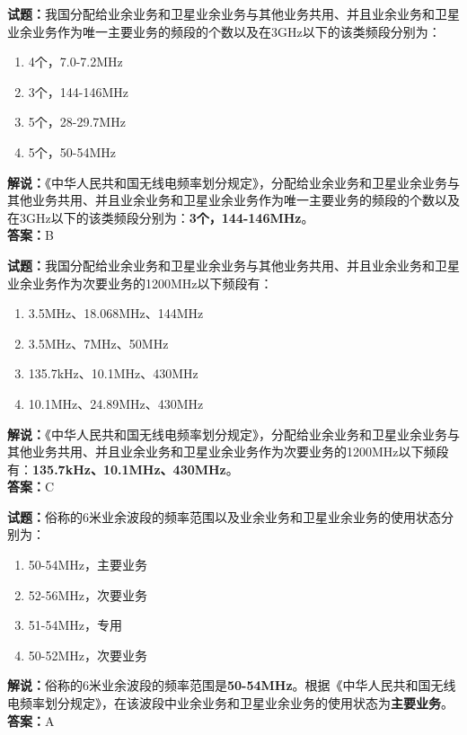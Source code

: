 \documentclass{ctexbook}
\begin{document}
\bigskip


\noindent\textbf{试题：}我国分配给业余业务和卫星业余业务与其他业务共用、并且业余业务和卫星业余业务作为唯一主要业务的频段的个数以及在3GHz以下的该类频段分别为：
\begin{enumerate}[leftmargin=3em]
	\item 4个，7.0-7.2MHz
	\item 3个，144-146MHz
	\item 5个，28-29.7MHz
	\item 5个，50-54MHz
\end{enumerate}
\noindent\textbf{解说：}《中华人民共和国无线电频率划分规定》，分配给业余业务和卫星业余业务与其他业务共用、并且业余业务和卫星业余业务作为唯一主要业务的频段的个数以及在3GHz以下的该类频段分别为：\textbf{3个，144-146MHz}。\\\noindent\textbf{答案：}B


\bigskip


\noindent\textbf{试题：}我国分配给业余业务和卫星业余业务与其他业务共用、并且业余业务和卫星业余业务作为次要业务的1200MHz以下频段有：
\begin{enumerate}[leftmargin=3em]
	\item 3.5MHz、18.068MHz、144MHz
	\item 3.5MHz、7MHz、50MHz
	\item 135.7kHz、10.1MHz、430MHz
	\item 10.1MHz、24.89MHz、430MHz
\end{enumerate}
\noindent\textbf{解说：}《中华人民共和国无线电频率划分规定》，分配给业余业务和卫星业余业务与其他业务共用、并且业余业务和卫星业余业务作为次要业务的1200MHz以下频段有：\textbf{135.7kHz、10.1MHz、430MHz}。\\\noindent\textbf{答案：}C




\bigskip


\noindent\textbf{试题：}俗称的6米业余波段的频率范围以及业余业务和卫星业余业务的使用状态分别为：
\begin{enumerate}[leftmargin=3em]
	\item 50-54MHz，主要业务
	\item 52-56MHz，次要业务
	\item 51-54MHz，专用
	\item 50-52MHz，次要业务
\end{enumerate}
\noindent\textbf{解说：}俗称的6米业余波段的频率范围是\textbf{50-54MHz}。根据《中华人民共和国无线电频率划分规定》，在该波段中业余业务和卫星业余业务的使用状态为\textbf{主要业务}。\\\noindent\textbf{答案：}A
\end{document}
